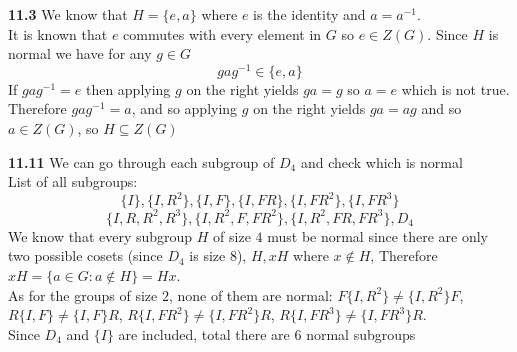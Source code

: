 \documentclass[12pt]{article}
\newenvironment{ques}{\vspace{2 ex}}{\vspace{2 ex}}
\theoremstyle{definition}
\begin{document}
\begin{ques}
	\textbf{11.3}
		We know that $H = \{e, a\}$ where $e$ is the identity and $a = a^{-1}$.\\
		It is known that $e$ commutes with every element in $G$ so $e \in Z(G)$. Since
		$H$ is normal we have
		for any $g \in G$
		$$gag^{-1} \in \{e, a\}$$
		If $gag^{-1} = e$ then applying $g$ on the right yields $ga = g$
		so $a = e$ which is not true.  Therefore $gag^{-1} = a$, and so
		applying $g$ on the right yields $ga = ag$ and so $a \in Z(G)$,
		so $H \subseteq Z(G)$
\end{ques}

\begin{ques}
	\textbf{11.11}
		We can go through each subgroup of $D_4$ and check which is normal\\
		List of all subgroups:\\
		$$\{I\}, \{I, R^2\}, \{I, F\}, \{I, FR\}, \{I, FR^2\}, \{I, FR^3\}$$
		$$\{I, R, R^2, R^3\}, \{I, R^2, F, FR^2\}, \{I, R^2, FR, FR^3\}, D_4$$
		We know that every subgroup $H$ of size $4$ must be normal since
		there are only two possible cosets (since $D_4$ is size $8$),
		$H, xH$ where $x \notin H$, Therefore $xH = \{a \in G: a \notin H\} = Hx$.\\
		As for the groups of size $2$, none of them are normal: $F\{I,
		R^2\} \neq \{I, R^2\}F$, $R\{I, F\} \neq \{I, F\}R$, $R\{I,
		FR^2\} \neq \{I, FR^2\}R$, $R\{I, FR^3\} \neq \{I, FR^3\}R$.\\
		Since $D_4$ and $\{I\}$ are included, total there are $6$ normal subgroups
		
		
\end{ques}
\end{document}
